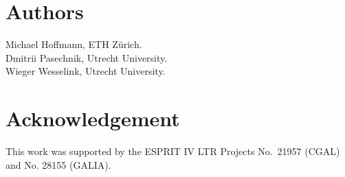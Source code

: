
\pagestyle{plain}
\setcounter{page}{1}
\newpage


\lcTex{\vspace*{2cm}}

\section*{Authors}

Michael Hoffmann, ETH Z\"urich.\\
Dmitrii Pasechnik, Utrecht University.\\
Wieger Wesselink, Utrecht University.

\section*{Acknowledgement}

This work was supported by the ESPRIT IV LTR Projects No.~21957 (CGAL)
and No. 28155 (GALIA).

